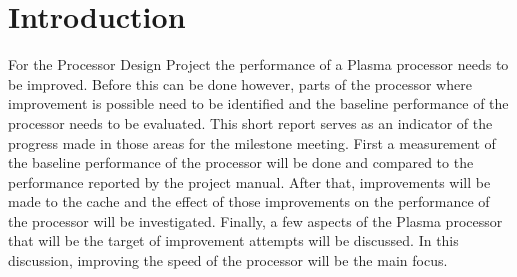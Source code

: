 \section{Introduction}
\label{sec:introduction}
For the Processor Design Project the performance of a Plasma processor needs to be improved. Before this can be done however, parts of the processor where improvement is possible need to be identified and the baseline performance of the processor needs to be evaluated. This short report serves as an indicator of the progress made in those areas for the milestone meeting. First a measurement of the baseline performance of the processor will be done and compared to the performance reported by the project manual. After that, improvements will be made to the cache and the effect of those improvements on the performance of the processor will be investigated. Finally, a few aspects of the Plasma processor that will be the target of improvement attempts will be discussed. In this discussion, improving the speed of the processor will be the main focus.